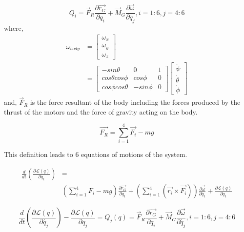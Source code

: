 \documentclass{article}
\begin{document}
\begin{equation}
Q_{i}=\overrightarrow{F}_{R}\frac{\partial\overrightarrow{r_{G}}}{\partial q_{i}}+\overrightarrow{M}_{G}\frac{\partial\overrightarrow{\omega}}{\partial\dot{q_{j}}}, i=1:6, j=4:6
\end{equation}
where,
\begin{equation}
\begin{split}
\omega_{body}&=\left[\begin{array}{c}
\omega_{x}\\
\omega_{y}\\
\omega_{z}
\end{array}\right] \\
&=\left[\begin{array}{ccc}
-sin\theta & 0 & 1\\
cos\theta cos\phi & cos\phi & 0\\
cos\phi cos\theta & -sin\phi & 0
\end{array}\right]\left[\begin{array}{c}
\dot{\psi}\\
\dot{\theta}\\
\dot{\phi}
\end{array}\right]
\end{split}
\end{equation}
and, $\overrightarrow{F}_{R}$ is the force resultant of the body including the forces produced by the thrust of the motors and the force of gravity acting on the body.

\begin{equation}
\overrightarrow{F_{R}}=\sum_{i=1}^{4}\overrightarrow{F_{i}}-mg
\end{equation}

This definition leads to 6 equations of motions of the system.

\begin{equation}
\begin{split}
\frac{d}{dt}(\frac{\partial\mathcal{L}(q)}{\partial\dot{q_{1}}})&= \\
&(\sum_{i=1}^{4}F_{i} - mg)\frac{\partial\overrightarrow{r_{G}}}{\partial q_{1}}+(\sum_{i=1}^{4}(\overrightarrow{r_{i}}\times\overrightarrow{F_{i}}))\frac{\partial\overrightarrow{\omega}}{\partial\dot{q_{1}}} + \frac{\partial\mathcal{L}(q)}{\partial q_{1}}
\end{split}
\end{equation}

\begin{equation}
\frac{d}{dt}(\frac{\partial\mathcal{L}(q)}{\partial\dot{q_{j}}})-\frac{\partial\mathcal{L}(q)}{\partial q_{j}}=Q_{j}(q) =\overrightarrow{F}_{R}\frac{\partial\overrightarrow{r_{G}}}{\partial q_{i}}+\overrightarrow{M}_{G}\frac{\partial\overrightarrow{\omega}}{\partial\dot{q_{j}}}, i=1:6, j=4:6
\end{equation}
\end{document}
